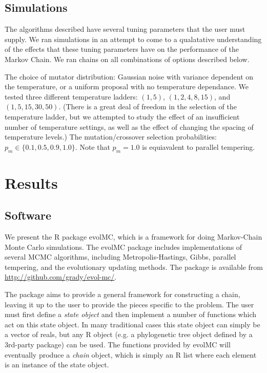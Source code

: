 \documentclass[12pt]{article}\usepackage[]{graphicx}\usepackage[]{color}
\begin{document}
\subsection{Simulations}
\label{sec:methods-simulations}
The algorithms described have several tuning parameters that the user
must supply. We ran simulations in an attempt to come to a qualatative
understanding of the effects that these tuning parameters have on the
performance of the Markov Chain. We ran chains on all combinations of
options described below.

The choice of mutator distribution: Gaussian noise with variance
dependent on the temperature, or a uniform proposal with no
temperature dependance.  We tested three different temperature
ladders: $(1,5)$, $(1,2, 4, 8, 15)$, and $(1,5,15,30,50)$. (There is a
great deal of freedom in the selection of the temperature ladder, but
we attempted to study the effect of an insufficient number of
temperature settings, as well as the effect of changing the spacing of
temperature levels.)  The mutation/crossover selection probabilities:
$p_m \in \{0.1, 0.5, 0.9, 1.0\}$. Note that $p_m = 1.0$ is equiavalent to
parallel tempering.

\section{Results}
\label{sec:results}

\subsection{Software}
\label{sec:software}

We present the R package evolMC, which is a framework for doing Markov-Chain Monte Carlo simulations. The evolMC package includes implementations of several MCMC algorithms, including Metropolis-Hastings, Gibbs, parallel tempering, and the evolutionary updating methods. The package is available from \url{http://github.com/grady/evol-mc/}.

The package aims to provide a general framework for constructing a chain, leaving it up to the user to provide the pieces specific to the problem. The user must first define a \emph{state object} and then implement a number of functions which act on this state object. In many traditional cases this state object can simply be a vector of reals, but any R object (e.g. a phylogenetic tree object defined by a 3rd-party package) can be used. The functions provided by evolMC will eventually produce a \emph{chain} object, which is simply an R list where each element is an instance of the state object.
\end{document}
